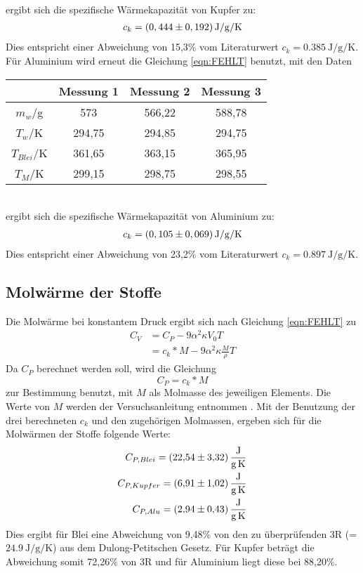 \\
ergibt sich die spezifische Wärmekapazität von Kupfer zu:
\begin{align*}
  c_k = \left(0,444 \pm 0,192 \right) \si{{\joule\per\gram\per\kelvin}}
\end{align*}
Dies entspricht einer Abweichung von 15,3\% vom Literaturwert $c_k = \SI{0,385}{\joule\per\gram\per\kelvin}$.
Für Aluminium wird erneut die Gleichung \ref{eqn:FEHLT} benutzt, mit den Daten
\begin{table}
  \centering
  \label{tab:WerteBlei}
  \begin{tabular}{c c c c}
   \toprule
   & Messung 1 & Messung 2 & Messung 3 \\
   \midrule
   $m_w$/g & 573 & 566,22 & 588,78 \\
   $T_w$/K & 294,75 & 294,85 & 294,75 \\
   $T_{Blei}$/K & 361,65 & 363,15 & 365,95 \\
   $T_M$/K & 299,15 & 298,75 & 298,55 \\
   \bottomrule
  \end{tabular}
\end{table}
\\
ergibt sich die spezifische Wärmekapazität von Aluminium zu:
\begin{align*}
  c_k = \left(0,105 \pm 0,069 \right) \si{{\joule\per\gram\per\kelvin}}
\end{align*}
Dies entspricht einer Abweichung von 23,2\% vom Literaturwert $c_k = \SI{0,897}{\joule\per\gram\per\kelvin}$.

\subsection{Molwärme der Stoffe}
\label{sec:Molwärme}
Die Molwärme bei konstantem Druck ergibt sich nach Gleichung \ref{eqn:FEHLT} zu
\begin{align*}
  C_V &= C_P - 9 \alpha^2 \kappa V_0 T\\
  &= c_k * M - 9 \alpha^2 \kappa \frac{M}{\rho}T
\end{align*}
Da $C_P$ berechnet werden soll, wird die Gleichung
\begin{equation}
  C_P = c_k * M
\end{equation}
zur Bestimmung benutzt, mit $M$ als Molmasse des jeweiligen Elements.
Die Werte von $M$ werden der Versuchsanleitung entnommen \cite{V201}.
Mit der Benutzung der drei berechneten $c_k$ und den zugehörigen Molmassen, ergeben sich für die Molwärmen der Stoffe folgende Werte:
\begin{align*}
  C_{P,Blei} = \SI{22,54 \pm 3.32}{\joule\per\gram\per\kelvin}\\
  C_{P,Kupfer} = \SI{6,91 \pm 1,02}{\joule\per\gram\per\kelvin}\\
  C_{P,Alu} = \SI{2,94 \pm 0,43}{\joule\per\gram\per\kelvin}
\end{align*}
Dies ergibt für Blei eine Abweichung von 9,48\% von den zu überprüfenden 3R (= $\SI{24,9}{\joule\per\gram\per\kelvin}$) aus dem Dulong-Petitschen Gesetz.
Für Kupfer beträgt die Abweichung somit 72,26\% von 3R und für Aluminium liegt diese bei 88,20\%.